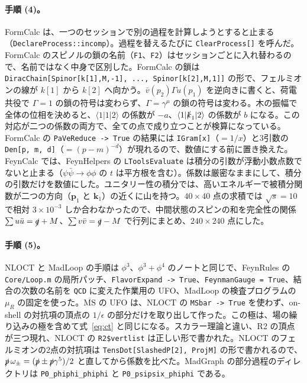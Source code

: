 \documentclass[a4paper,10pt]{ltjsarticle}
\newcommand{\MSbar}{\overline{\mathrm{MS}}}
\begin{document}
\paragraph{手順 (4)。}FormCalc は、一つのセッションで別の過程を計算しようとすると止まる（\texttt{DeclareProcess::incomp}）。過程を替えるたびに \texttt{ClearProcess[]} を呼んだ。FormCalc のスピノルの鎖の名前（\texttt{F1}、\texttt{F2}）はセッションごとに入れ替わるので、名前ではなく中身で区別した。FormCalc の鎖は \texttt{DiracChain[Spinor[k[1],M,-1], ..., Spinor[k[2],M,1]]} の形で、フェルミオンの線が $k[1]$ から $k[2]$ へ向かう。$\bar v(p_2)\Gamma u(p_1)$ を逆向きに書くと、荷電共役で $\Gamma=1$ の鎖の符号は変わらず、$\Gamma=\gamma^\mu$ の鎖の符号は変わる。木の振幅で全体の位相を決めると、$\langle1|1|2\rangle$ の係数が $-a$、$\langle1|\slashed k_1|2\rangle$ の係数が $b$ になる。この対応が二つの係数の両方で、全ての点で成り立つことが検算になっている。FormCalc の \texttt{PaVeReduce -> True} の結果には \texttt{IGram[x]}（$=1/x$）と3引数の \texttt{Den[p, m, d]}（$=(p-m)^{-d}$）が現れるので、数値にする前に置き換えた。FeynCalc では、FeynHelpers の \texttt{LToolsEvaluate} は積分の引数が浮動小数点数でないと止まる（$\psi\bar\psi\to\phi\phi$ の $t$ は平方根を含む）。係数は厳密なままにして、積分の引数だけを数値にした。ユニタリー性の積分では、高いエネルギーで被積分関数が二つの方向（$\boldsymbol p_1$ と $\boldsymbol k_1$）の近くに山を持つ。$40\times40$ 点の求積では $\sqrt s=10$ で相対 $3\times10^{-3}$ しか合わなかったので、中間状態のスピンの和を完全性の関係 $\sum u\bar u=\slashed q+M$、$\sum v\bar v=\slashed q-M$ で行列にまとめ、$240\times240$ 点にした。

\paragraph{手順 (5)。}NLOCT と MadLoop の手順は $\phi^3$、$\phi^3+\phi^4$ のノートと同じで、FeynRules の \texttt{Core/Loop.m} の局所パッチ、\texttt{FlavorExpand -> True}、\texttt{FeynmanGauge = True}、結合の次数の名前を \texttt{QCD} に変えた作業用の UFO、MadLoop の検査プログラムの $\mu_R$ の固定を使った。$\MSbar$ の UFO は、NLOCT の \texttt{MSbar -> True} を使わず、on-shell の対抗項の頂点の $1/\epsilon$ の部分だけを取り出して作った。この極は、場の繰り込みの極を含めて式~\eqref{eq:ct} と同じになる。スカラー理論と違い、R2 の頂点が三つ現れ、NLOCT の \texttt{R2\$vertlist} は正しい形で書かれた。NLOCT のフェルミオンの2点の対抗項は \texttt{TensDot[SlashedP[2], ProjM]} の形で書かれるので、$\slashed p\,\omega_\pm=(\slashed p\pm\slashed p\gamma^5)/2$ と直してから係数を比べた。MadGraph の部分過程のディレクトリは \texttt{P0\_phiphi\_phiphi} と \texttt{P0\_psipsix\_phiphi} である。
\end{document}
